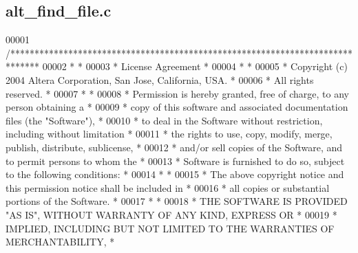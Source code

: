 \subsection{alt\+\_\+find\+\_\+file.\+c}
\label{alt__find__file_8c_source}

\begin{DoxyCode}
00001 \textcolor{comment}{/******************************************************************************}
00002 \textcolor{comment}{*                                                                             *}
00003 \textcolor{comment}{* License Agreement                                                           *}
00004 \textcolor{comment}{*                                                                             *}
00005 \textcolor{comment}{* Copyright (c) 2004 Altera Corporation, San Jose, California, USA.           *}
00006 \textcolor{comment}{* All rights reserved.                                                        *}
00007 \textcolor{comment}{*                                                                             *}
00008 \textcolor{comment}{* Permission is hereby granted, free of charge, to any person obtaining a     *}
00009 \textcolor{comment}{* copy of this software and associated documentation files (the "Software"),  *}
00010 \textcolor{comment}{* to deal in the Software without restriction, including without limitation   *}
00011 \textcolor{comment}{* the rights to use, copy, modify, merge, publish, distribute, sublicense,    *}
00012 \textcolor{comment}{* and/or sell copies of the Software, and to permit persons to whom the       *}
00013 \textcolor{comment}{* Software is furnished to do so, subject to the following conditions:        *}
00014 \textcolor{comment}{*                                                                             *}
00015 \textcolor{comment}{* The above copyright notice and this permission notice shall be included in  *}
00016 \textcolor{comment}{* all copies or substantial portions of the Software.                         *}
00017 \textcolor{comment}{*                                                                             *}
00018 \textcolor{comment}{* THE SOFTWARE IS PROVIDED "AS IS", WITHOUT WARRANTY OF ANY KIND, EXPRESS OR  *}
00019 \textcolor{comment}{* IMPLIED, INCLUDING BUT NOT LIMITED TO THE WARRANTIES OF MERCHANTABILITY,    *}

\end{DoxyCode}
